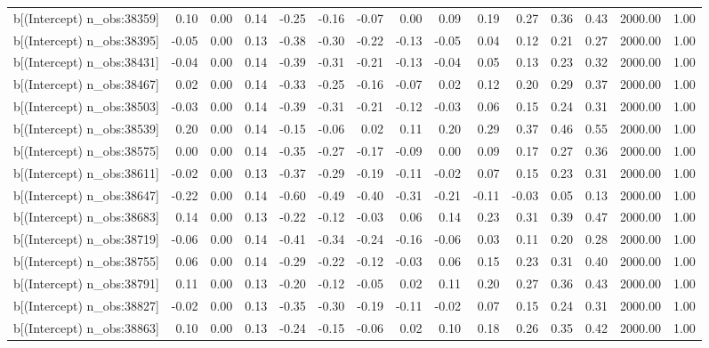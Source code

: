 \begin{table}[ht]
\begin{tabular}{rrrrrrrrrrrrrrr}
  b[(Intercept) n\_obs:38359] & 0.10 & 0.00 & 0.14 & -0.25 & -0.16 & -0.07 & 0.00 & 0.09 & 0.19 & 0.27 & 0.36 & 0.43 & 2000.00 & 1.00 \\ 
  b[(Intercept) n\_obs:38395] & -0.05 & 0.00 & 0.13 & -0.38 & -0.30 & -0.22 & -0.13 & -0.05 & 0.04 & 0.12 & 0.21 & 0.27 & 2000.00 & 1.00 \\ 
  b[(Intercept) n\_obs:38431] & -0.04 & 0.00 & 0.14 & -0.39 & -0.31 & -0.21 & -0.13 & -0.04 & 0.05 & 0.13 & 0.23 & 0.32 & 2000.00 & 1.00 \\ 
  b[(Intercept) n\_obs:38467] & 0.02 & 0.00 & 0.14 & -0.33 & -0.25 & -0.16 & -0.07 & 0.02 & 0.12 & 0.20 & 0.29 & 0.37 & 2000.00 & 1.00 \\ 
  b[(Intercept) n\_obs:38503] & -0.03 & 0.00 & 0.14 & -0.39 & -0.31 & -0.21 & -0.12 & -0.03 & 0.06 & 0.15 & 0.24 & 0.31 & 2000.00 & 1.00 \\ 
  b[(Intercept) n\_obs:38539] & 0.20 & 0.00 & 0.14 & -0.15 & -0.06 & 0.02 & 0.11 & 0.20 & 0.29 & 0.37 & 0.46 & 0.55 & 2000.00 & 1.00 \\ 
  b[(Intercept) n\_obs:38575] & 0.00 & 0.00 & 0.14 & -0.35 & -0.27 & -0.17 & -0.09 & 0.00 & 0.09 & 0.17 & 0.27 & 0.36 & 2000.00 & 1.00 \\ 
  b[(Intercept) n\_obs:38611] & -0.02 & 0.00 & 0.13 & -0.37 & -0.29 & -0.19 & -0.11 & -0.02 & 0.07 & 0.15 & 0.23 & 0.31 & 2000.00 & 1.00 \\ 
  b[(Intercept) n\_obs:38647] & -0.22 & 0.00 & 0.14 & -0.60 & -0.49 & -0.40 & -0.31 & -0.21 & -0.11 & -0.03 & 0.05 & 0.13 & 2000.00 & 1.00 \\ 
  b[(Intercept) n\_obs:38683] & 0.14 & 0.00 & 0.13 & -0.22 & -0.12 & -0.03 & 0.06 & 0.14 & 0.23 & 0.31 & 0.39 & 0.47 & 2000.00 & 1.00 \\ 
  b[(Intercept) n\_obs:38719] & -0.06 & 0.00 & 0.14 & -0.41 & -0.34 & -0.24 & -0.16 & -0.06 & 0.03 & 0.11 & 0.20 & 0.28 & 2000.00 & 1.00 \\ 
  b[(Intercept) n\_obs:38755] & 0.06 & 0.00 & 0.14 & -0.29 & -0.22 & -0.12 & -0.03 & 0.06 & 0.15 & 0.23 & 0.31 & 0.40 & 2000.00 & 1.00 \\ 
  b[(Intercept) n\_obs:38791] & 0.11 & 0.00 & 0.13 & -0.20 & -0.12 & -0.05 & 0.02 & 0.11 & 0.20 & 0.27 & 0.36 & 0.43 & 2000.00 & 1.00 \\ 
  b[(Intercept) n\_obs:38827] & -0.02 & 0.00 & 0.13 & -0.35 & -0.30 & -0.19 & -0.11 & -0.02 & 0.07 & 0.15 & 0.24 & 0.31 & 2000.00 & 1.00 \\ 
  b[(Intercept) n\_obs:38863] & 0.10 & 0.00 & 0.13 & -0.24 & -0.15 & -0.06 & 0.02 & 0.10 & 0.18 & 0.26 & 0.35 & 0.42 & 2000.00 & 1.00 \\ 

\end{tabular}
\end{table}
